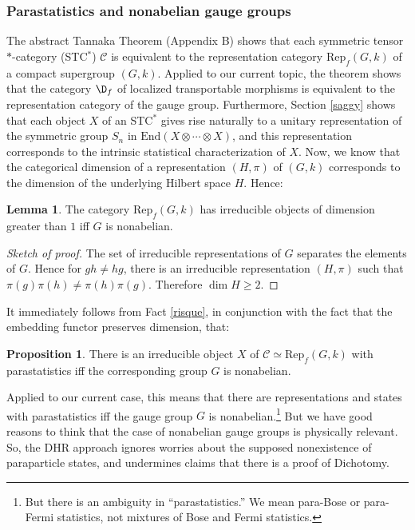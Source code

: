\documentclass[11pt]{article}
\theoremstyle{definition}
\newtheorem{prop}[thm]{Proposition}
\newtheorem{lemma}[thm]{Lemma}
\theoremstyle{definition}
\theoremstyle{remark}
\def\2#1{{\mathcal #1}}
\newcommand{\End}{\mathrm{End}}
\newcommand{\Rep}{\mathrm{Rep}}
\begin{document}
\subsubsection{Parastatistics and nonabelian gauge groups}

The abstract Tannaka Theorem (Appendix B) shows that
each symmetric tensor $*$-category (STC$^*$) $\2C$ is
equivalent to the representation category $\Rep
_f(G,k)$ of a compact supergroup $(G,k)$.  Applied to
our current topic, the theorem shows that the category
$\D _f$ of localized transportable morphisms is
equivalent to the representation category of the gauge
group.  Furthermore, Section \ref{saggy} shows that
each object $X$ of an STC$^*$ gives rise naturally to a
unitary representation of the symmetric group $S_n$ in
$\End (X\otimes \cdots \otimes X)$, and this
representation corresponds to the intrinsic statistical
characterization of $X$.  Now, we know that the
categorical dimension of a representation $(H,\pi )$ of
$(G,k)$ corresponds to the dimension of the underlying
Hilbert space $H$.  Hence:

\begin{lemma} The category $\Rep _f(G,k)$ has irreducible objects of
  dimension greater than $1$ iff $G$ is nonabelian.  \end{lemma}

\begin{proof}[Sketch of proof] The set of irreducible representations
  of $G$ separates the elements of $G$.  Hence for $gh\neq hg$, there
  is an irreducible representation $(H,\pi )$ such that $\pi (g)\pi
  (h)\neq \pi (h)\pi (g)$.  Therefore $\dim H\geq 2$.  \end{proof}
\noindent It immediately follows from Fact \ref{risque}, in
conjunction with the fact that the embedding functor preserves
dimension, that:

\begin{prop} There is an irreducible object $X$ of $\2C \simeq \Rep
  _f(G,k)$ with parastatistics iff the corresponding group $G$ is nonabelian.
\end{prop}

Applied to our current case, this means that there are representations
and states with parastatistics iff the gauge group $G$ is
nonabelian.\footnote{But there is an ambiguity in ``parastatistics.''
  We mean para-Bose or para-Fermi statistics, not mixtures of Bose and
  Fermi statistics.}  But we have good reasons to think that the case
of nonabelian gauge groups is physically relevant.  So, the DHR
approach ignores worries about the supposed nonexistence of
paraparticle states, and undermines claims that there is a proof of
Dichotomy.
\end{document}
